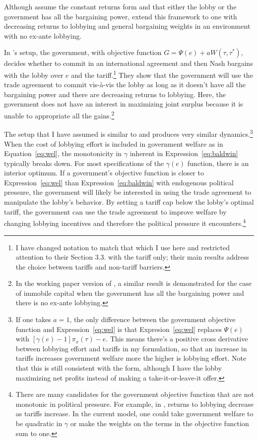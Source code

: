 \documentclass[12pt,titlepage]{article}
\newcommand{\ga}{\gamma}
\begin{document}
Although \Textcite{mrc2007} assume the constant returns form and that either the lobby or the government has all the bargaining power, \Textcite{lt} extend this framework to one with decreasing returns to lobbying and general bargaining weights in an environment with no ex-ante lobbying.

In \Textcite{lt}'s setup, the government, with objective function $G = \Psi(e) + aW(\tau,\tau^*)$, decides whether to commit in an international agreement and then Nash bargains with the lobby over $e$ and the tariff.\footnote{I have changed notation to match that which I use here and restricted attention to their Section 3.3. with the tariff only; their main results address the choice between tariffs and non-tariff barriers.} They show that the government will use the trade agreement to commit vis-\`{a}-vis the lobby as long as it doesn't have all the bargaining power and there are decreasing returns to lobbying. Here, the government does not have an interest in maximizing joint surplus because it is unable to appropriate all the gains.\footnote{In the working paper version of \Textcite{mrc2007}, a similar result is demonstrated for the case of immobile capital when the government has all the bargaining power and there is no ex-ante lobbying.}

The setup that I have assumed is similar to \Textcite{lt} and produces very similar dynamics.\footnote{If one takes $a=1$, the only difference between the \Textcite{lt} government objective function and Expression~\ref{eq:wel} is that Expresion~\ref{eq:wel} replaces $\Psi(e)$ with $[\ga(e) - 1]\pi_x(\tau) - e$. This means there's a positive cross derivative between lobbying effort and tariffs in my formulation, so that an increase in tariffs increases government welfare more the higher is lobbying effort. Note that this is still consistent with the \Textcite{dgh97} form, although I have the lobby maximizing net profits instead of making a take-it-or-leave-it offer. } When the cost of lobbying effort is included in government welfare as in Equation~\ref{eq:wel}, the monotonicity in $\ga$ inherent in Expression~\ref{eq:baldwin} typically breaks down. For most specifications of the $\ga(e)$ function, there is an interior optimum. If a government's objective function is closer to Expression~\ref{eq:wel} than Expression~\ref{eq:baldwin} with endogenous political pressure, the government will likely be interested in using the trade agreement to manipulate the lobby's behavior. By setting a tariff cap below the lobby's optimal tariff, the government can use the trade agreement to improve welfare by changing lobbying incentives and therefore the political pressure it encounters.\footnote{There are many candidates for the government objective function that are not monotonic in political pressure. For example, in \Textcite{ethier2012}, returns to lobbying decrease as tariffs increase. In the current model, one could take government welfare to be quadratic in $\ga$ or make the weights on the terms in the objective function sum to one.}
\end{document}
